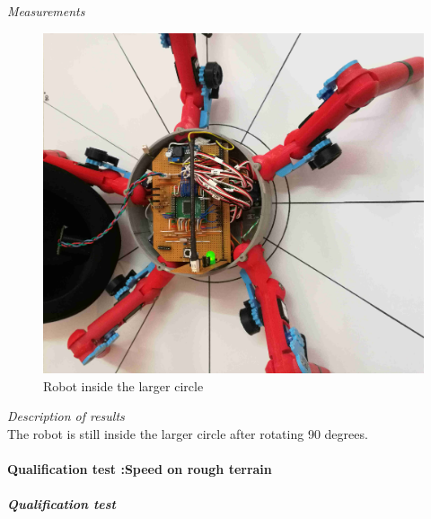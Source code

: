 \textit{Measurements}\\
\begin{figure}[H]
\centering
\includegraphics[scale = 1]{pics/Res3.jpg}
\caption{Robot inside the larger circle}
\label{fig:Res3}
\end{figure}
\textit{Description of results}\\
The robot is still inside the larger circle after rotating 90 degrees.

\paragraph{Qualification test  :Speed on rough terrain}
\subparagraph{Qualification test}

